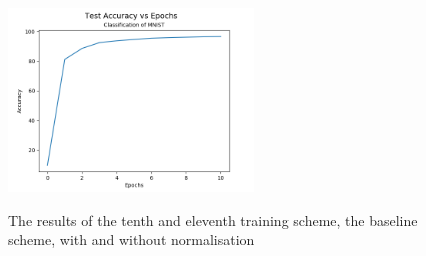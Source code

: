 \begin{figure}[H]
{      \includegraphics[width=65mm]{figs/run_11/test_accuracy_fp.png}
    }
    \hspace{0mm}
    \hspace{0mm}
    
    \caption{The results of the tenth and eleventh training scheme, the baseline scheme, with and without normalisation}
    \label{fig:training_scheme_10_11}
\end{figure}

